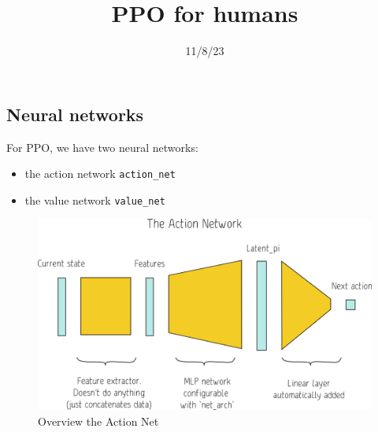 \documentclass[
  letterpaper,
  DIV=11,
  numbers=noendperiod]{scrartcl}
\title{PPO for humans}
\author{}
\date{11/8/23}
\providecommand{\tightlist}{%
  \setlength{\itemsep}{0pt}\setlength{\parskip}{0pt}}\usepackage{longtable,booktabs,array}
\renewcommand*\contentsname{Table of contents}
\newcommand\contentsname{Table of contents}
\begin{document}
\maketitle
\ifdefined\Shaded\renewenvironment{Shaded}{\begin{tcolorbox}[interior hidden, borderline west={3pt}{0pt}{shadecolor}, sharp corners, breakable, frame hidden, enhanced, boxrule=0pt]}{\end{tcolorbox}}\fi

\renewcommand*\contentsname{Table of contents}
{
\hypersetup{linkcolor=}
\setcounter{tocdepth}{3}
\tableofcontents
}
\hypertarget{neural-networks}{%
\subsection{Neural networks}\label{neural-networks}}

For PPO, we have two neural networks:

\begin{itemize}
\tightlist
\item
  the action network \texttt{action\_net}
\item
  the value network \texttt{value\_net}
\end{itemize}

\begin{figure}

{\centering \includegraphics{img/ActionNet.png}

}

\caption{Overview the Action Net}

\end{figure}

\hfill\break
\end{document}
